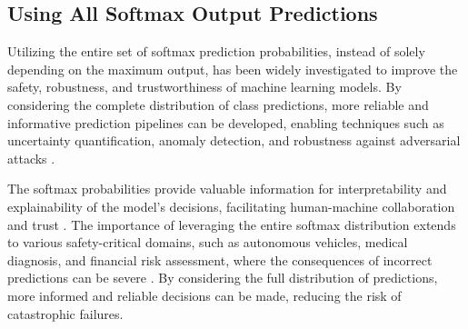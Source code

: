 


\subsection{Using All Softmax Output Predictions}

Utilizing the entire set of softmax prediction probabilities, instead of solely depending on the maximum output, has been widely investigated to improve the safety, robustness, and trustworthiness of machine learning models. By considering the complete distribution of class predictions, more reliable and informative prediction pipelines can be developed, enabling techniques such as uncertainty quantification, anomaly detection, and robustness against adversarial attacks \cite{kendall2017uncertainties, lakshminarayanan2017simple, hendrycks17baseline, goodfellow2014explaining, szegedy2013intriguing}.

The softmax probabilities provide valuable information for interpretability and explainability of the model's decisions, facilitating human-machine collaboration and trust \cite{ribeiro2016should, doshi2017towards}. The importance of leveraging the entire softmax distribution extends to various safety-critical domains, such as autonomous vehicles, medical diagnosis, and financial risk assessment, where the consequences of incorrect predictions can be severe \cite{michelmore2018evaluating, leibig2017leveraging}. By considering the full distribution of predictions, more informed and reliable decisions can be made, reducing the risk of catastrophic failures.

